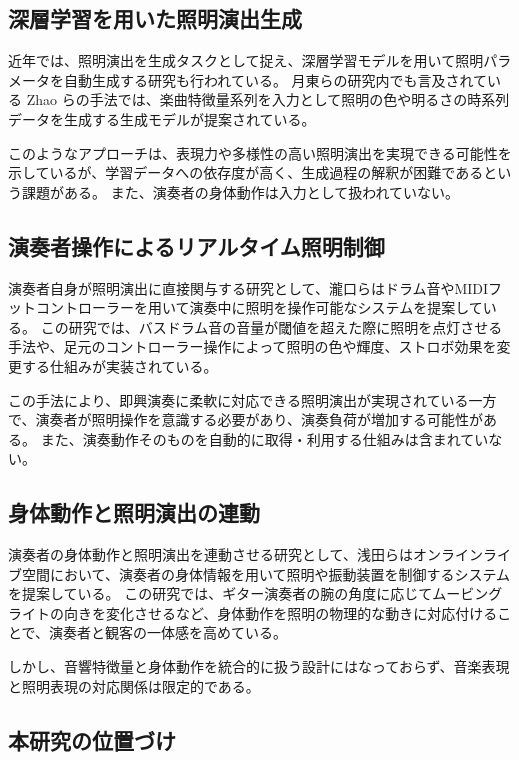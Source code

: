 \subsection{深層学習を用いた照明演出生成}

近年では、照明演出を生成タスクとして捉え、深層学習モデルを用いて照明パラメータを自動生成する研究も行われている。
月東らの研究内でも言及されている Zhao らの手法では、楽曲特徴量系列を入力として照明の色や明るさの時系列データを生成する生成モデルが提案されている\cite{Zhao25}。

このようなアプローチは、表現力や多様性の高い照明演出を実現できる可能性を示しているが、学習データへの依存度が高く、生成過程の解釈が困難であるという課題がある。
また、演奏者の身体動作は入力として扱われていない。

\subsection{演奏者操作によるリアルタイム照明制御}

演奏者自身が照明演出に直接関与する研究として、瀧口らはドラム音やMIDIフットコントローラーを用いて演奏中に照明を操作可能なシステムを提案している\cite{takiguchi25}。
この研究では、バスドラム音の音量が閾値を超えた際に照明を点灯させる手法や、足元のコントローラー操作によって照明の色や輝度、ストロボ効果を変更する仕組みが実装されている。

この手法により、即興演奏に柔軟に対応できる照明演出が実現されている一方で、演奏者が照明操作を意識する必要があり、演奏負荷が増加する可能性がある。
また、演奏動作そのものを自動的に取得・利用する仕組みは含まれていない。

\subsection{身体動作と照明演出の連動}

演奏者の身体動作と照明演出を連動させる研究として、浅田らはオンラインライブ空間において、演奏者の身体情報を用いて照明や振動装置を制御するシステムを提案している\cite{asada20}。
この研究では、ギター演奏者の腕の角度に応じてムービングライトの向きを変化させるなど、身体動作を照明の物理的な動きに対応付けることで、演奏者と観客の一体感を高めている。

しかし、音響特徴量と身体動作を統合的に扱う設計にはなっておらず、音楽表現と照明表現の対応関係は限定的である。

\subsection{本研究の位置づけ}

